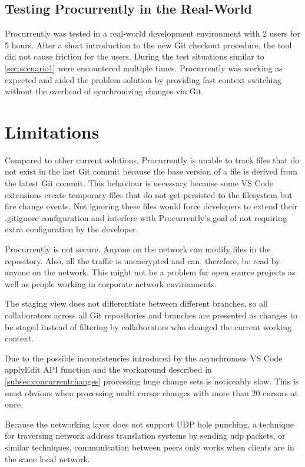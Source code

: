 \subsection{Testing Procurrently in the Real-World}

Procurrently was tested in a real-world development environment with 2 users for 5 hours. After a short introduction to the new Git checkout procedure, the tool did not cause friction for the users. During the test situations similar to \autoref{sec:scenario1} were encountered multiple times. Procurrently was working as expected and aided the problem solution by providing fast context switching without the overhead of synchronizing changes via Git.

\section{Limitations}
\label{limitations}

Compared to other current solutions, Procurrently is unable to track files that do not exist in the last Git commit because the base version of a file is derived from the latest Git commit. This behaviour is necessary because some VS Code extensions create temporary files that do not get persisted to the filesystem but fire change events. Not ignoring these files would force developers to extend their .gitignore configuration and interfere with Procurrently's goal of not requiring extra configuration by the developer.

Procurrently is not secure. Anyone on the network can modify files in the repository. Also, all the traffic is unencrypted and can, therefore, be read by anyone on the network. This might not be a problem for open source projects as well as people working in corporate network environments.

The staging view does not differentiate between different branches, so all collaborators across all Git repositories and branches are presented as changes to be staged instead of filtering by collaborators who changed the current working context.

Due to the possible inconsistencies introduced by the asynchronous VS Code applyEdit API function and the workaround described in \autoref{subsec:concurrentchanges} processing huge change sets is noticeably slow. This is most obvious when processing multi cursor changes with more than 20 cursors at once.

Because the networking layer does not support UDP hole punching, a technique for traversing network address translation systems by sending udp packets, \cite{10.1007/978-3-642-20798-3_1} or similar techniques, communication between peers only works when clients are in the same local network.

